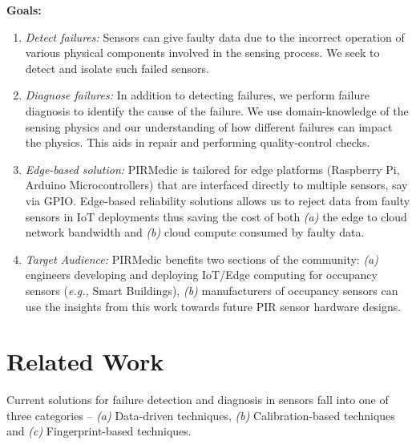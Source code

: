 \documentclass[manuscript]{acmart}
\newcommand{\eg}{{\it e.g.,}\xspace}
\newcommand{\ca}{{\it (a) }}
\newcommand{\cb}{{\it (b) }}
\newcommand{\cc}{{\it (c) }}
\newcommand{\sol}{{PIRMedic}\xspace}
\begin{document}
\noindent \textbf{Goals:}
\begin{enumerate}[leftmargin=*]
	\itemsep0pt
	
	\item {\itshape Detect failures:} Sensors can give faulty data due to the incorrect operation of various physical components involved in the sensing process. We seek to detect and isolate such failed sensors. 

	\item {\itshape Diagnose failures:} In addition to detecting failures, we perform failure diagnosis to identify the cause of the failure. We use domain-knowledge of the sensing physics and our understanding of how different failures can impact the physics. This aids in repair and performing quality-control checks.
	
	\item {\itshape Edge-based solution:} \sol is tailored for edge platforms (Raspberry Pi, Arduino Microcontrollers) that are interfaced directly to multiple sensors, say via GPIO. Edge-based reliability solutions allows us to reject data from faulty sensors in IoT deployments thus saving the cost of both \ca the edge to cloud network bandwidth and \cb cloud compute consumed by faulty data.
	
	\item {\itshape Target Audience:} \sol benefits two sections of the community: \ca engineers developing and deploying IoT/Edge computing for occupancy sensors (\eg Smart Buildings), \cb manufacturers of occupancy sensors can use the insights from this work towards future PIR sensor hardware designs.
	
\end{enumerate}


 \section{Related Work} 
\label{sec:related}







Current solutions for failure detection and diagnosis in sensors fall into one of three categories -- \ca Data-driven techniques, \cb Calibration-based techniques and \cc Fingerprint-based techniques.
\end{document}

